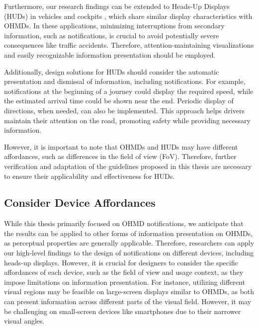 Furthermore, our research findings can be extended to Heads-Up Displays (HUDs) in vehicles and cockpits \cite{noauthor_continental_2022, sexton_15_1988}, which share similar display characteristics with OHMDs. In these applications, minimizing interruptions from secondary information, such as notifications, is crucial to avoid potentially severe consequences like traffic accidents. Therefore, attention-maintaining visualizations and easily recognizable information presentation should be employed.

Additionally, design solutions for HUDs should consider the automatic presentation and dismissal of information, including notifications. For example, notifications at the beginning of a journey could display the required speed, while the estimated arrival time could be shown near the end. Periodic display of directions, when needed, can also be implemented. This approach helps drivers maintain their attention on the road, promoting safety while providing necessary information.

However, it is important to note that OHMDs and HUDs may have different affordances, such as differences in the field of view (FoV). Therefore, further verification and adaptation of the guidelines proposed in this thesis are necessary to ensure their applicability and effectiveness for HUDs.

\subsection{Consider Device Affordances}

While this thesis primarily focused on OHMD notifications, we anticipate that the results can be applied to other forms of information presentation on OHMDs, as perceptual properties are generally applicable. Therefore, researchers can apply our high-level findings to the design of notifications on different devices, including heads-up displays. However, it is crucial for designers to consider the specific affordances of each device, such as the field of view and usage context, as they impose limitations on information presentation. For instance, utilizing different visual regions may be feasible on large-screen displays similar to OHMDs, as both can present information across different parts of the visual field. However, it may be challenging on small-screen devices like smartphones due to their narrower visual angles.

